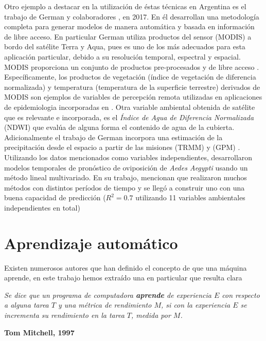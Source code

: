 \par Otro ejemplo a destacar en la utilización de éstas técnicas en Argentina es
  el trabajo de German y colaboradores \cite{german_temporal}, en 2017.
  En él desarrollan una metodología completa
  para generar modelos de manera automática y basada en información de libre
  acceso. En particular German \cite{german_temporal} utiliza productos del sensor (MODIS) a bordo
  del satélite Terra y Aqua, pues es uno de los más adecuados para esta
  aplicación particular, debido a su resolución temporal, espectral y espacial.
  MODIS proporciona un conjunto de productos pre-procesados y de libre acceso \cite{terra_aqua_modis}.
  Específicamente, los productos de vegetación (índice de vegetación de diferencia
  normalizada) y temperatura (temperatura de la superficie terrestre) derivados
  de MODIS son ejemplos de variables de percepción remota utilizadas
  en aplicaciones de epidemiologia \cite{porcasi_operative, butt_use_modis}
  incorporadas en \cite{german_temporal}. Otra variable
  ambiental obtenida de satélite que es relevante e incorporada, es el
  \textit{Índice de Agua de Diferencia Normalizada} (NDWI) que evalúa de alguna
  forma el contenido de agua de la cubierta. Adicionalmente el trabajo de German
  incorpora una estimación de la precipitación desde el espacio a partir de las
  misiones (TRMM) y (GPM) \cite{trmm_mision}.
  Utilizando los datos mencionados como variables independientes,
  desarrollaron modelos temporales de pronóstico de oviposición de \textit{Aedes Aegypti}
  usando un método lineal multivariado. En su trabajo, mencionan que
  realizaron muchos métodos con distintos períodos de tiempo y se llegó a
  construir uno con una buena capacidad de
  predicción ($R^{2} = 0.7 $ utilizando 11 variables ambientales independientes en total)


  \section{Aprendizaje automático}

    \par Existen numerosos autores que han definido el concepto de que una máquina
      aprende, en este trabajo hemos extraído una en particular que resulta
      clara
      \begin{framed}
        \begin{center}
          \textit{Se dice que un programa de computadora \textbf{aprende} de experiencia
          $E$ con respecto a alguna tarea $T$ y una métrica de rendimiento $M$, si
          con la experiencia $E$ se incrementa su rendimiento en la tarea $T$,
          medida por $M$.}\\
        \end{center}
        \centering \textbf{Tom Mitchell, 1997} \cite{mitchell_learn}
      \end{framed}


